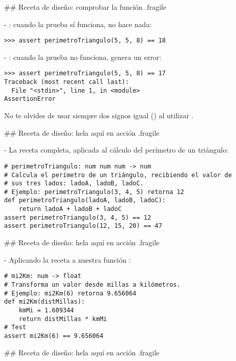 ## Receta de diseño: comprobar la función {.fragile}

- : cuando la prueba sí funciona, no hace nada:

\begin{lstlisting}
>>> assert perimetroTriangulo(5, 5, 8) == 18
\end{lstlisting}

- : cuando la prueba no funciona, genera un error:

\begin{lstlisting}
>>> assert perimetroTriangulo(5, 5, 8) == 17
Traceback (most recent call last):
  File "<stdin>", line 1, in <module>
AssertionError
\end{lstlisting}

\bgnblockidea
No te olvides de usar siempre dos signos igual (\nzinlinecode{==}) al utilizar .
\trmblockidea

## Receta de diseño: hela aquí en acción {.fragile}


- La receta completa, aplicada al cálculo del perímetro de un triángulo:

\begin{lstlisting}[linewidth=.8\textwidth,xleftmargin=.1\textwidth]
# perimetroTriangulo: num num num -> num
# Calcula el perímetro de un triángulo, recibiendo el valor de
# sus tres lados: ladoA, ladoB, ladoC.
# Ejemplo: perimetroTriangulo(3, 4, 5) retorna 12
def perimetroTriangulo(ladoA, ladoB, ladoC):
    return ladoA + ladoB + ladoC
assert perimetroTriangulo(3, 4, 5) == 12
assert perimetroTriangulo(12, 15, 20) == 47
\end{lstlisting}

## Receta de diseño: hela aquí en acción {.fragile}


- Aplicando la receta a nuestra función :

\begin{lstlisting}[linewidth=.8\textwidth,xleftmargin=.1\textwidth]
# mi2Km: num -> float
# Transforma un valor desde millas a kilómetros.
# Ejemplo: mi2Km(6) retorna 9.656064
def mi2Km(distMillas):
    kmMi = 1.609344
    return distMillas * kmMi
# Test
assert mi2Km(6) == 9.656064
\end{lstlisting}

## Receta de diseño: hela aquí en acción {.fragile}


